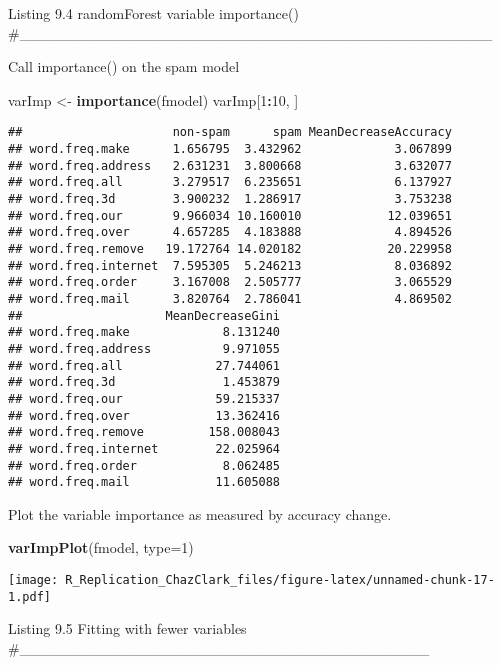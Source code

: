 \documentclass[]{article}
\newenvironment{Shaded}{\begin{snugshade}}{\end{snugshade}}
\newcommand{\DataTypeTok}[1]{\textcolor[rgb]{0.13,0.29,0.53}{#1}}
\newcommand{\DecValTok}[1]{\textcolor[rgb]{0.00,0.00,0.81}{#1}}
\newcommand{\KeywordTok}[1]{\textcolor[rgb]{0.13,0.29,0.53}{\textbf{#1}}}
\newcommand{\NormalTok}[1]{#1}
\newcommand{\OperatorTok}[1]{\textcolor[rgb]{0.81,0.36,0.00}{\textbf{#1}}}
\newcommand{\StringTok}[1]{\textcolor[rgb]{0.31,0.60,0.02}{#1}}
\begin{document}
Listing 9.4 randomForest variable importance()
\#\_\_\_\_\_\_\_\_\_\_\_\_\_\_\_\_\_\_\_\_\_\_\_\_\_\_\_\_\_\_\_\_\_\_\_\_\_\_\_\_\_\_\_\_\_

Call importance() on the spam model

\begin{Shaded}
\begin{Highlighting}[]
\NormalTok{varImp <-}\StringTok{ }\KeywordTok{importance}\NormalTok{(fmodel)}
\NormalTok{varImp[}\DecValTok{1}\OperatorTok{:}\DecValTok{10}\NormalTok{, ]}
\end{Highlighting}
\end{Shaded}

\begin{verbatim}
##                     non-spam      spam MeanDecreaseAccuracy
## word.freq.make      1.656795  3.432962             3.067899
## word.freq.address   2.631231  3.800668             3.632077
## word.freq.all       3.279517  6.235651             6.137927
## word.freq.3d        3.900232  1.286917             3.753238
## word.freq.our       9.966034 10.160010            12.039651
## word.freq.over      4.657285  4.183888             4.894526
## word.freq.remove   19.172764 14.020182            20.229958
## word.freq.internet  7.595305  5.246213             8.036892
## word.freq.order     3.167008  2.505777             3.065529
## word.freq.mail      3.820764  2.786041             4.869502
##                    MeanDecreaseGini
## word.freq.make             8.131240
## word.freq.address          9.971055
## word.freq.all             27.744061
## word.freq.3d               1.453879
## word.freq.our             59.215337
## word.freq.over            13.362416
## word.freq.remove         158.008043
## word.freq.internet        22.025964
## word.freq.order            8.062485
## word.freq.mail            11.605088
\end{verbatim}

Plot the variable importance as measured by accuracy change.

\begin{Shaded}
\begin{Highlighting}[]
\KeywordTok{varImpPlot}\NormalTok{(fmodel, }\DataTypeTok{type=}\DecValTok{1}\NormalTok{)}
\end{Highlighting}
\end{Shaded}

\texttt{[image: R\_Replication\_ChazClark\_files/figure-latex/unnamed-chunk-17-1.pdf]}

Listing 9.5 Fitting with fewer variables
\#\_\_\_\_\_\_\_\_\_\_\_\_\_\_\_\_\_\_\_\_\_\_\_\_\_\_\_\_\_\_\_\_\_\_\_\_\_\_\_
\end{document}
